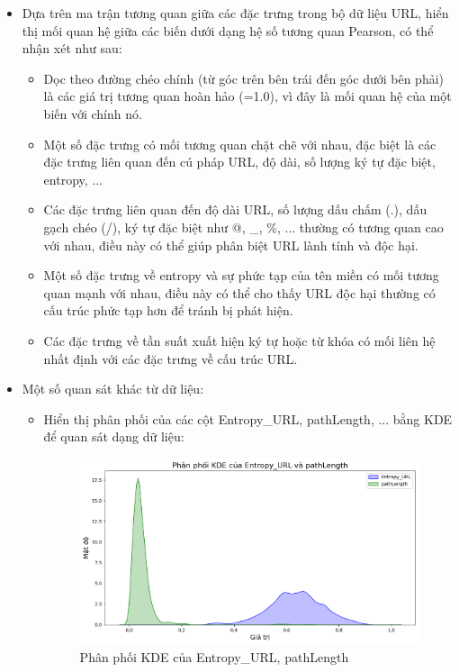 \documentclass[13pt]{article}
\begin{document}
\begin{itemize}
    \item Dựa trên ma trận tương quan giữa các đặc trưng trong bộ dữ liệu URL, hiển thị mối quan hệ giữa các biến dưới dạng hệ số tương quan Pearson, có thể nhận xét như sau:
    \begin{itemize}
        \item Dọc theo đường chéo chính (từ góc trên bên trái đến góc dưới bên phải) là các giá trị tương quan hoàn hảo (=1.0), vì đây là mối quan hệ của một biến với chính nó.
        \item Một số đặc trưng có mối tương quan chặt chẽ với nhau, đặc biệt là các đặc trưng liên quan đến cú pháp URL, độ dài, số lượng ký tự đặc biệt, entropy, ...
        \item Các đặc trưng liên quan đến độ dài URL, số lượng dấu chấm (.), dấu gạch chéo (/), ký tự đặc biệt như @, \_, \%, ... thường có tương quan cao với nhau, điều này có thể giúp phân biệt URL lành tính và độc hại.
        \item Một số đặc trưng về entropy và sự phức tạp của tên miền có mối tương quan mạnh với nhau, điều này có thể cho thấy URL độc hại thường có cấu trúc phức tạp hơn để tránh bị phát hiện.
        \item Các đặc trưng về tần suất xuất hiện ký tự hoặc từ khóa có mối liên hệ nhất định với các đặc trưng về cấu trúc URL.
    \end{itemize}
    \item Một số quan sát khác từ dữ liệu:
    \begin{itemize}
        \item Hiển thị phân phối của các cột Entropy\_URL, pathLength, ... bằng KDE để quan sát dạng dữ liệu:

     \begin{figure}[h!]
        \centering        \includegraphics[width=0.7\linewidth]{image/h17.png}
            \caption{Phân phối KDE của Entropy\_URL, pathLength}
            \label{fig:label1}
    \end{figure}
    

\end{itemize}
\end{itemize}
\end{document}
